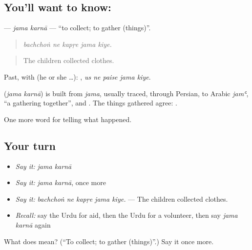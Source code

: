 \subsection*{You'll want to know:  }
\textbf{ } — \emph{jama karnā} — \textquotedblleft{}to collect; to gather (things)\textquotedblright{}.

\begin{quote}
    
\end{quote}

\begin{quote}
\emph{bachchoṅ ne kapṛe jama kiye.}
\end{quote}

\begin{quote}
The children collected clothes.
\end{quote}

Past, with  (he or she …):     , \emph{us ne paise jama kiye}.

\begin{cousinweb}
\textbf{ } (\emph{jama karnā}) is built from \emph{jama}, usually traced, through Persian, to Arabic \emph{jamʿ}, \textquotedblleft{}a gathering together\textquotedblright{}, and \textbf{}. The things gathered agree: \textbf{  }.
\end{cousinweb}

\begin{grammarlens}[title={What you've built}]
One more word for telling what happened.
\end{grammarlens}

\subsection*{Your turn}
\begin{itemize}
\raggedright
  \item \emph{Say it:} \emph{jama karnā}
  \item \emph{Say it:} \emph{jama karnā}, once more
  \item \emph{Say it:} \emph{bachchoṅ ne kapṛe jama kiye.} — The children collected clothes.
  \item \emph{Recall:} say the Urdu for aid, then the Urdu for a volunteer, then say \emph{jama karnā} again
\end{itemize}

\begin{tcolorbox}[breakable,colback=teal!4,colframe=teal!35!black,title={Before you move on}]
What does   mean? (\textquotedblleft{}To collect; to gather (things)\textquotedblright{}.) Say it once more.
\end{tcolorbox}
